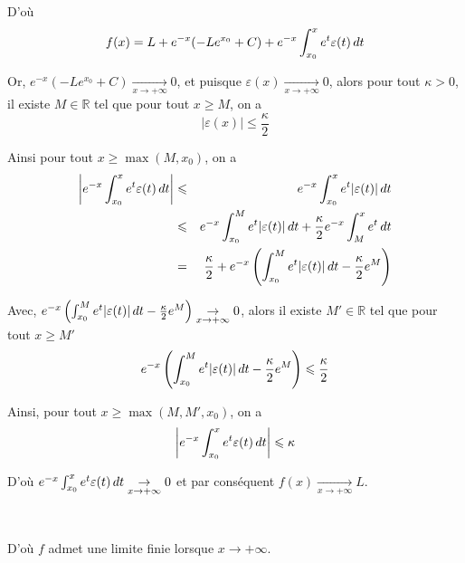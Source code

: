 D'o{\`u}
\[ f (x) = L + e^{- x}  (- Le^{x_0} + C) + e^{- x}  \int_{x_0}^x e^t
   \varepsilon (t) \hspace{0.17em} dt \]


Or, $e^{- x}  (- Le^{x_0} + C)  \underset{x \rightarrow + \infty}{\to} 0$, et
puisque $\varepsilon (x) \underset{x \rightarrow + \infty}{\to} 0$, alors pour
tout $\kappa > 0$, il existe $M \in \mathbb{R}$ tel que pour tout $x \geqslant
M$, on a
\[ | \varepsilon (x) | \leqslant \frac{\kappa}{2} \]


Ainsi pour tout $x \geqslant \max (M, x_0)$, on a
\begin{eqnarray*}
  \left| e^{- x}  \int_{x_0}^x e^t \varepsilon (t) \hspace{0.17em} dt \right|
  & \leqslant & e^{- x}  \int_{x_0}^x e^t  | \varepsilon (t) | \hspace{0.17em}
  dt\\
  & \leqslant & e^{- x}  \int_{x_0}^M e^t  | \varepsilon (t) |
  \hspace{0.17em} dt + \frac{\kappa}{2} e^{- x} \int_M^x e^t  \hspace{0.17em}
  dt\\
  & = & \frac{\kappa}{2} + e^{- x} \left( \int_{x_0}^M e^t  | \varepsilon (t)
  | \hspace{0.17em} dt - \frac{\kappa}{2} e^M \right)
\end{eqnarray*}


Avec, $e^{- x} \left( \int_{x_0}^M e^t  | \varepsilon (t) | \hspace{0.17em} dt
- \frac{\kappa}{2} e^M \right) \underset{x \rightarrow + \infty}{\to} 0$,
alors il existe $M' \in \mathbb{R}$ tel que pour tout $x \geqslant M'$
\[ e^{- x} \left( \int_{x_0}^M e^t  | \varepsilon (t) | \hspace{0.17em} dt -
   \frac{\kappa}{2} e^M \right) \leqslant \frac{\kappa}{2} \]


Ainsi, pour tout $x \geqslant \max (M, M', x_0)$, on a
\[ \left| e^{- x}  \int_{x_0}^x e^t \varepsilon (t) \hspace{0.17em} dt \right|
   \leqslant \kappa \]


D'o{\`u} $e^{- x}  \int_{x_0}^x e^t \varepsilon (t) \hspace{0.17em} dt
\underset{x \rightarrow + \infty}{\to} 0$ et par cons{\'e}quent $f (x)
\underset{x \rightarrow + \infty}{\to} L$.

\

D'o{\`u} $f$ admet une limite finie lorsque $x \to + \infty$.

